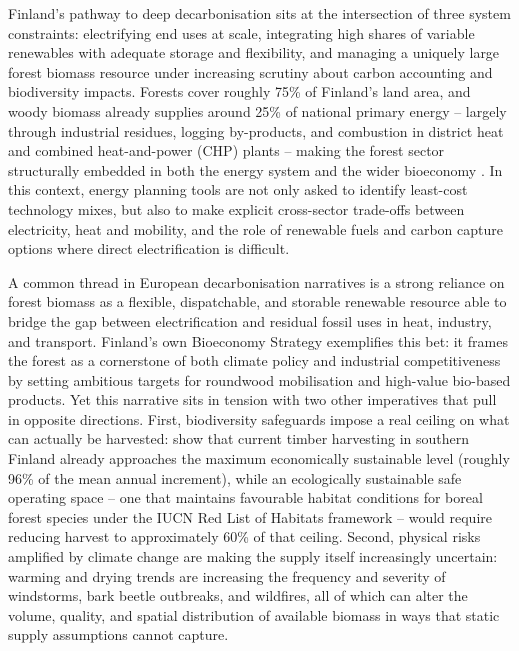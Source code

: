 \documentclass{article}
\begin{document}
Finland's pathway to deep decarbonisation sits at the intersection of three system constraints: electrifying end uses at scale, integrating high shares of variable renewables with adequate storage and flexibility, and managing a uniquely large forest biomass resource under increasing scrutiny about carbon accounting and biodiversity impacts. Forests cover roughly 75\% of Finland's land area, and woody biomass already supplies around 25\% of national primary energy -- largely through industrial residues, logging by-products, and combustion in district heat and combined heat-and-power (CHP) plants -- making the forest sector structurally embedded in both the energy system and the wider bioeconomy \citep{blattertSectoralPoliciesCause2022}. In this context, energy planning tools are not only asked to identify least-cost technology mixes, but also to make explicit cross-sector trade-offs between electricity, heat and mobility, and the role of renewable fuels and carbon capture options where direct electrification is difficult.

A common thread in European decarbonisation narratives is a strong reliance on forest biomass as a flexible, dispatchable, and storable renewable resource able to bridge the gap between electrification and residual fossil uses in heat, industry, and transport. Finland's own Bioeconomy Strategy exemplifies this bet: it frames the forest as a cornerstone of both climate policy and industrial competitiveness by setting ambitious targets for roundwood mobilisation and high-value bio-based products. Yet this narrative sits in tension with two other imperatives that pull in opposite directions. First, biodiversity safeguards impose a real ceiling on what can actually be harvested: \citet{monkkonenEcologicallyEconomicallySustainable2024} show that current timber harvesting in southern Finland already approaches the maximum economically sustainable level (roughly 96\% of the mean annual increment), while an ecologically sustainable safe operating space -- one that maintains favourable habitat conditions for boreal forest species under the IUCN Red List of Habitats framework -- would require reducing harvest to approximately 60\% of that ceiling. Second, physical risks amplified by climate change are making the supply itself increasingly uncertain: warming and drying trends are increasing the frequency and severity of windstorms, bark beetle outbreaks, and wildfires, all of which can alter the volume, quality, and spatial distribution of available biomass in ways that static supply assumptions cannot capture.
\end{document}
